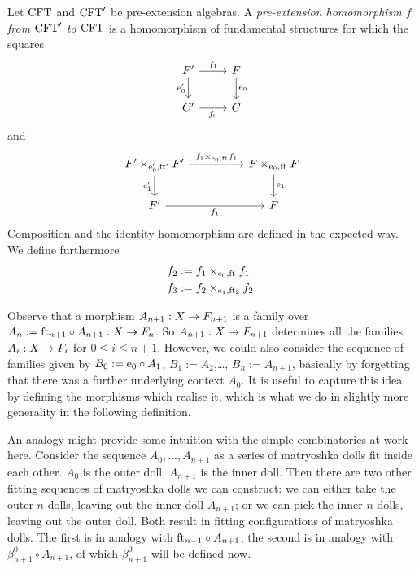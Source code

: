 \begin{defn}
Let $\stesys$ and $\stesys'$ be pre-extension algebras. A \emph{pre-extension 
homomorphism $f$ from $\stesys'$ to $\stesys$} is a homomorphism of fundamental
structures for which the squares
\begin{equation*}
\begin{tikzcd}
\stesysf' 
  \ar{r}{f_1}
  \ar{d}[swap]{\ectxext'}
  &
\stesysf
  \ar{d}{\ectxext}
  \\
\stesysc'
  \ar{r}[swap]{f_0}
  &
\stesysc
\end{tikzcd}
\end{equation*}
and
\begin{equation*}
\begin{tikzcd}[column sep=huge]
\stesysf'\times_{\ectxext',\eft'} \stesysf'
  \ar{r}{f_1\times_{\ectxext,\eft} f_1}
  \ar{d}[swap]{\efamext'}
  &
\stesysf\times_{\ectxext,\eft} \stesysf
  \ar{d}{\efamext}
  \\
\stesysf'
  \ar{r}[swap]{f_1}
  &
\stesysf
\end{tikzcd}
\end{equation*}
Composition and the identity homomorphism are defined in the expected way. We
define furthermore
\begin{align*}
f_2 & := \pullback{f_1}{f_1}{\ectxext}{\eft}
  \\
f_3 & := \pullback{f_2}{f_2}{\efamext}{\eft[2]}.
\end{align*}
\end{defn}

Observe that a morphism $A_{n+1}:X\to\stesysf_{n+1}$ is a family over
$A_n:=\eft[n+1]\circ A_{n+1}:X\to\stesysf_n$. So $A_{n+1}:X\to\stesysf_{n+1}$
determines all the families $A_i:X\to\stesysf_i$ for $0\leq i\leq n+1$.
However, we could also consider the sequence of families given by
$B_0:= \ectxext\circ A_1$, $B_1:=A_2$,\ldots, $B_n:=A_{n+1}$, basically by
forgetting that there was a further underlying context $A_0$.
It is useful to capture this idea by defining the morphisms which realise it,
which is what we do in slightly more generality in the following definition.

An analogy might provide some intuition with the simple combinatorics at
work here. Consider the sequence $A_0,\ldots,A_{n+1}$ as a series of
matryoshka dolls fit inside each other. $A_0$ is the outer doll, $A_{n+1}$ is
the inner doll. Then there are two other fitting sequences of matryoshka dolls
we can construct: we can either take the outer $n$ dolls, leaving out the inner
doll $A_{n+1}$; or we can pick the inner $n$ dolls, leaving out the outer doll.
Both result in fitting configurations of matryoshka dolls. The first is in
analogy with $\eft[n+1]\circ A_{n+1}$, the second is in analogy with
$\beta^0_{n+1}\circ A_{n+1}$, of which $\beta^0_{n+1}$ will be defined now.

